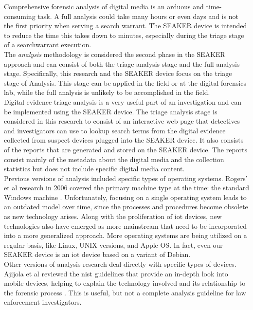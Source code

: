 \documentclass[12pt]{article}
\begin{document}
Comprehensive forensic analysis of digital media is an arduous and time-consuming task.  A full
analysis could take many hours or even days and is not the first priority when serving a search
warrant.  The SEAKER device is intended to reduce the time this takes down to minutes,
especially during the triage stage of a \gls{searchwarrant} execution.\\

The {\em analysis} methodology is considered the second phase in the SEAKER approach and 
can consist of both the triage analysis stage and the full analysis stage.
Specifically, this research and the SEAKER device focus on the triage stage of Analysis.  This
stage can be applied in the field or at the digital forensics lab, while the full analysis
is unlikely to be accomplished in the field.\\

Digital evidence triage analysis is a very useful part of an investigation and can be 
implemented using the SEAKER device.  The triage analysis stage is considered in this research
to consist of an interactive web page that detectives and investigators can use to 
lookup search terms from the digital evidence collected from suspect devices plugged into the
SEAKER device.  It also consists of the reports that are generated and stored on the
SEAKER device.  The reports consist mainly of the metadata about the digital media and the
collection statistics but does not include specific digital media content.\\

Previous versions of analysis included specific types of operating systems.
Rogers' et al research in 2006 covered the primary machine type at the time: the standard
Windows machine \cite{rogers2006computer}.  Unfortunately, focusing on a single operating system
leads to an outdated model over time, since the processes and procedures become obsolete as
new technology arises.  Along with the proliferation of \gls{iot} devices, new technologies
also have emerged as more mainstream that need to be incorporated into a more generalized
approach.  More operating systems are being utilized on a regular basis, like Linux, UNIX
versions, and Apple OS.  In fact, even our SEAKER device is an \gls{iot} device based on a
variant of Debian.\\

Other versions of analysis research deal directly with specific types of devices.
Ajijola et al reviewed the \gls{nist} guidelines that provide an in-depth
look into mobile devices, helping to explain the technology involved and its
relationship to the forensic process \cite{ajijola2014review}. This is useful, but not a complete analysis
guideline for law enforcement investigators.\\
\end{document}
